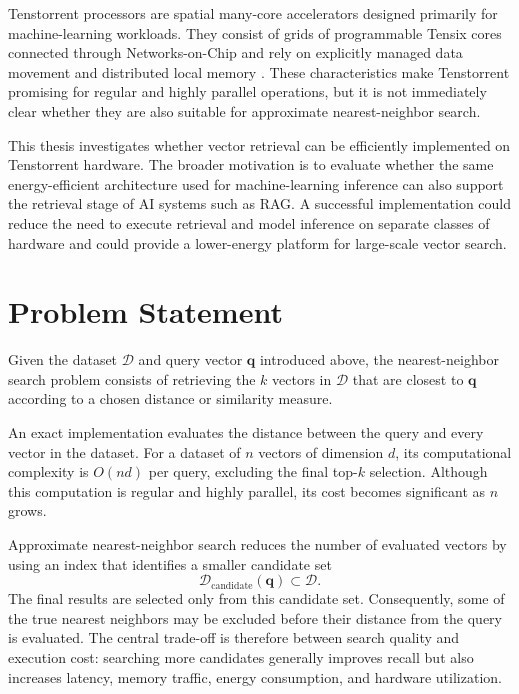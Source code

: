 Tenstorrent processors are spatial many-core accelerators designed primarily for machine-learning workloads. They consist of grids of programmable Tensix cores connected through Networks-on-Chip and rely on explicitly managed data movement and distributed local memory \cite{tenstorrent_metalium_architecture}. These characteristics make Tenstorrent promising for regular and highly parallel operations, but it is not immediately clear whether they are also suitable for approximate nearest-neighbor search.

This thesis investigates whether vector retrieval can be efficiently implemented on Tenstorrent hardware. The broader motivation is to evaluate whether the same energy-efficient architecture used for machine-learning inference can also support the retrieval stage of AI systems such as RAG. A successful implementation could reduce the need to execute retrieval and model inference on separate classes of hardware and could provide a lower-energy platform for large-scale vector search.

\section{Problem Statement}
\label{sec:problem-statement}

Given the dataset \(\mathcal{D}\) and query vector \(\mathbf{q}\) introduced above, the nearest-neighbor search problem consists of retrieving the \(k\) vectors in \(\mathcal{D}\) that are closest to \(\mathbf{q}\) according to a chosen distance or similarity measure.

An exact implementation evaluates the distance between the query and every vector in the dataset. For a dataset of \(n\) vectors of dimension \(d\), its computational complexity is \(O(nd)\) per query, excluding the final top-\(k\) selection. Although this computation is regular and highly parallel, its cost becomes significant as \(n\) grows.

Approximate nearest-neighbor search reduces the number of evaluated vectors by using an index that identifies a smaller candidate set
\begin{equation}
\mathcal{D}_{\mathrm{candidate}}(\mathbf{q})\subset\mathcal{D}.
\end{equation}
The final results are selected only from this candidate set. Consequently, some of the true nearest neighbors may be excluded before their distance from the query is evaluated. The central trade-off is therefore between search quality and execution cost: searching more candidates generally improves recall but also increases latency, memory traffic, energy consumption, and hardware utilization.

